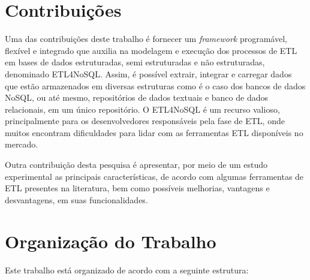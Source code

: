 
\section{Contribuições}

Uma das contribuições deste trabalho é fornecer um \textit{framework} programável, flexível e integrado que auxilia na modelagem e execução dos processos de ETL em bases de dados estruturadas, semi estruturadas e não estruturadas, denominado ETL4NoSQL. Assim, é possível extrair, integrar e carregar dados que estão armazenados em diversas estruturas como é o caso dos bancos de dados NoSQL, ou até mesmo, repositórios de dados textuais e banco de dados relacionais, em um único repositório. O ETL4NoSQL é um recurso valioso, principalmente para os desenvolvedores responsáveis pela fase de ETL, onde muitos encontram dificuldades para lidar com as ferramentas ETL disponíveis no mercado. 

Outra contribuição desta pesquisa é apresentar, por meio de um estudo experimental as principais características, de acordo com algumas ferramentas de ETL presentes na literatura, bem como possíveis melhorias, vantagens e desvantagens, em suas funcionalidades.

\section{Organização do Trabalho}

Este trabalho está organizado de acordo com a seguinte estrutura:


